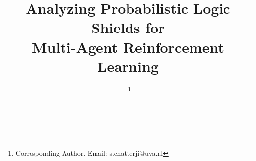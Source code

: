 \documentclass{ecai}
\theoremstyle{plain}
\theoremstyle{definition}
\theoremstyle{remark}
\begin{document}

\begin{frontmatter}





\title{Analyzing Probabilistic Logic Shields for \\Multi-Agent Reinforcement Learning}


\author[A]{~\thanks{Corresponding Author. Email: s.chatterji@uva.nl}}
\author[A]{~}

\address[A]{IvI \& ILLC, University of Amsterdam}


\begin{abstract}



\end{abstract}
\end{frontmatter}
\end{document}
